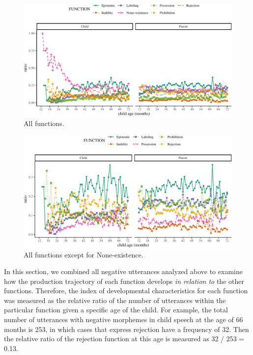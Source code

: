 \documentclass[10pt, letterpaper]{article}
\newenvironment{CodeChunk}{}{}
\begin{document}
\begin{figure}[h]
\begin{CodeChunk}


\begin{center}\includegraphics{figs/all-1} \end{center}

\end{CodeChunk}
\caption[This image spans both columns]{All functions.}\label{fig:all}
\end{figure}

\begin{figure}[h]
\begin{CodeChunk}


\begin{center}\includegraphics{figs/exclude-1} \end{center}

\end{CodeChunk}
\caption[This image spans both columns]{All functions except for None-existence.}\label{fig:exclude}
\end{figure}

In this section, we combined all negative utterances analyzed above to
examine how the production trajectory of each function develops \emph{in
relation to} the other functions. Therefore, the index of developmental
characteristics for each function was measured as the relative ratio of
the number of utterances within the particular function given a specific
age of the child. For example, the total number of utterances with
negative morphemes in child speech at the age of 66 months is 253, in
which cases that express rejection have a frequency of 32. Then the
relative ratio of the rejection function at this age is measured as 32 /
253 = 0.13.
\end{document}

